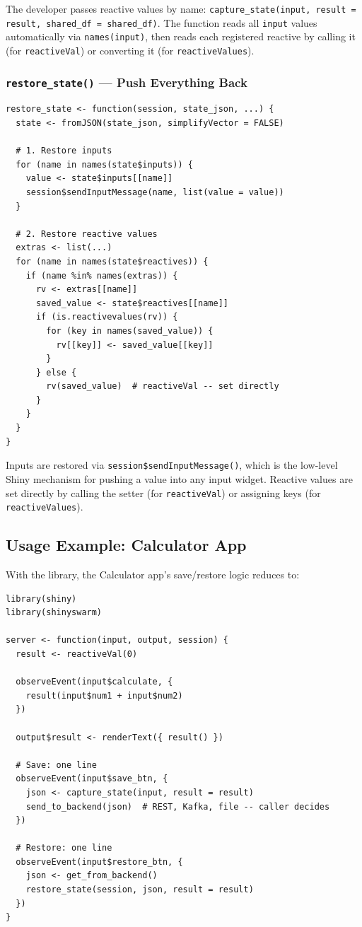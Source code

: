 \documentclass[11pt,a4paper]{article}
\begin{document}
The developer passes reactive values by name: \texttt{capture\_state(input,
result = result, shared\_df = shared\_df)}. The function reads all
\texttt{input} values automatically via \texttt{names(input)}, then reads each
registered reactive by calling it (for \texttt{reactiveVal}) or converting it
(for \texttt{reactiveValues}).

\subsubsection{\texttt{restore\_state()} --- Push Everything Back}

\begin{verbatim}
restore_state <- function(session, state_json, ...) {
  state <- fromJSON(state_json, simplifyVector = FALSE)

  # 1. Restore inputs
  for (name in names(state$inputs)) {
    value <- state$inputs[[name]]
    session$sendInputMessage(name, list(value = value))
  }

  # 2. Restore reactive values
  extras <- list(...)
  for (name in names(state$reactives)) {
    if (name %in% names(extras)) {
      rv <- extras[[name]]
      saved_value <- state$reactives[[name]]
      if (is.reactivevalues(rv)) {
        for (key in names(saved_value)) {
          rv[[key]] <- saved_value[[key]]
        }
      } else {
        rv(saved_value)  # reactiveVal -- set directly
      }
    }
  }
}
\end{verbatim}

Inputs are restored via \texttt{session\$sendInputMessage()}, which is the
low-level Shiny mechanism for pushing a value into any input widget. Reactive
values are set directly by calling the setter (for \texttt{reactiveVal}) or
assigning keys (for \texttt{reactiveValues}).

\subsection{Usage Example: Calculator App}

With the library, the Calculator app's save/restore logic reduces to:

\begin{verbatim}
library(shiny)
library(shinyswarm)

server <- function(input, output, session) {
  result <- reactiveVal(0)

  observeEvent(input$calculate, {
    result(input$num1 + input$num2)
  })

  output$result <- renderText({ result() })

  # Save: one line
  observeEvent(input$save_btn, {
    json <- capture_state(input, result = result)
    send_to_backend(json)  # REST, Kafka, file -- caller decides
  })

  # Restore: one line
  observeEvent(input$restore_btn, {
    json <- get_from_backend()
    restore_state(session, json, result = result)
  })
}
\end{verbatim}
\end{document}
